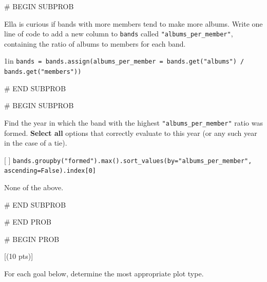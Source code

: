 \documentclass[twoside,12pt]{article}
\begin{document}
# BEGIN SUBPROB


Ella is curious if bands with more members tend to make more albums. Write one line of code to add a new column to \texttt{bands} called \texttt{"albums\_per\_member"},
containing the ratio of albums to members for each band.

\smallskip
\begin{responsebox}{1in}
\texttt{bands = bands.assign(albums\_per\_member = bands.get("albums") / bands.get("members"))}
\end{responsebox}


# END SUBPROB

\bigskip

# BEGIN SUBPROB

  
Find the year in which the band with the highest \texttt{"albums\_per\_member"} ratio was formed. \textbf{Select all} options that correctly evaluate to this year (or any such year in the case of a tie).




\small
[ ] {\texttt{bands.groupby("formed").max().sort\_values(by="albums\_per\_member", \gap ascending=False).index[0]}}




\smallskip
[ ] None of the above.



# END SUBPROB



# END PROB

\newpage

# BEGIN PROB

[(10 pts)]

For each goal below, determine the most appropriate plot type.
\end{document}
